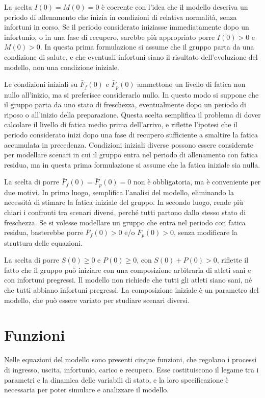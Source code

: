 La scelta $I(0) = M(0) = 0$ è coerente con l'idea che il modello descriva un periodo di allenamento che inizia in condizioni di relativa normalità, senza infortuni in corso. Se il periodo considerato iniziasse immediatamente dopo un infortunio, o in una fase di recupero, sarebbe più appropriato porre $I(0) > 0$ e $M(0) > 0$. In questa prima formulazione si assume che il gruppo parta da una condizione di salute, e che eventuali infortuni siano il risultato dell'evoluzione del modello, non una condizione iniziale.

Le condizioni iniziali su $\bar{F}_f(0)$ e $\bar{F}_p(0)$ ammettono un livello di fatica non nullo all'inizio, ma si preferisce considerarlo nullo. In questo modo si suppone che il gruppo parta da uno stato di freschezza, eventualmente dopo un periodo di riposo o all'inizio della preparazione. Questa scelta semplifica il problema di dover calcolare il livello di fatica medio prima dell'arrivo, e riflette l'ipotesi che il periodo considerato inizi dopo una fase di recupero sufficiente a smaltire la fatica accumulata in precedenza. Condizioni iniziali diverse possono essere considerate per modellare scenari in cui il gruppo entra nel periodo di allenamento con fatica residua, ma in questa prima formulazione si assume che la fatica iniziale sia nulla.

La scelta di porre $\bar{F}_f(0) = \bar{F}_p(0) = 0$ non è obbligatoria, ma è conveniente per due motivi. In primo luogo, semplifica l'analisi del modello, eliminando la necessità di stimare la fatica iniziale del gruppo. In secondo luogo, rende più chiari i confronti tra scenari diversi, perché tutti partono dallo stesso stato di freschezza. Se si volesse modellare un gruppo che entra nel periodo con fatica residua, basterebbe porre $\bar{F}_f(0) > 0$ e/o $\bar{F}_p(0) > 0$, senza modificare la struttura delle equazioni.

La scelta di porre $S(0) \geq 0$ e $P(0) \geq 0$, con $S(0) + P(0) > 0$, riflette il fatto che il gruppo può iniziare con una composizione arbitraria di atleti sani e con infortuni pregressi. Il modello non richiede che tutti gli atleti siano sani, né che tutti abbiano infortuni pregressi. La composizione iniziale è un parametro del modello, che può essere variato per studiare scenari diversi.

\section{Funzioni}

Nelle equazioni del modello sono presenti cinque funzioni, che regolano i processi di ingresso, uscita, infortunio, carico e recupero. Esse costituiscono il legame tra i parametri e la dinamica delle variabili di stato, e la loro specificazione è necessaria per poter simulare e analizzare il modello.

